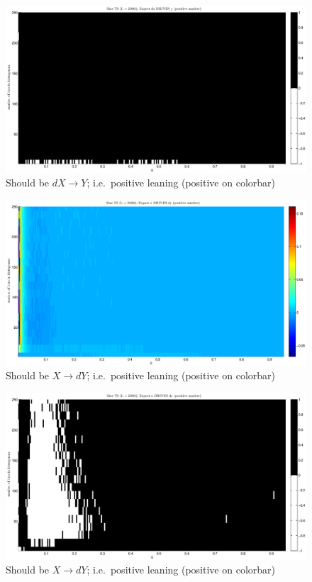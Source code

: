 \documentclass[a4paper,11pt]{article}
\begin{document}
\begin{figure}[!H]
\includegraphics[scale=0.55]{SineTSdxy_3C.eps}
\caption{Should be $dX\rightarrow Y$; i.e.\ positive leaning (positive on colorbar)}
\end{figure}
\begin{figure}[!H]
\includegraphics[scale=0.55]{SineTSxdy.eps}
\caption{Should be $X\rightarrow dY$; i.e.\ positive leaning (positive on colorbar)}
\end{figure}
\begin{figure}[!H]
\includegraphics[scale=0.55]{SineTSxdy_3C.eps}
\caption{Should be $X\rightarrow dY$; i.e.\ positive leaning (positive on colorbar)}
\end{figure}
\end{document}
